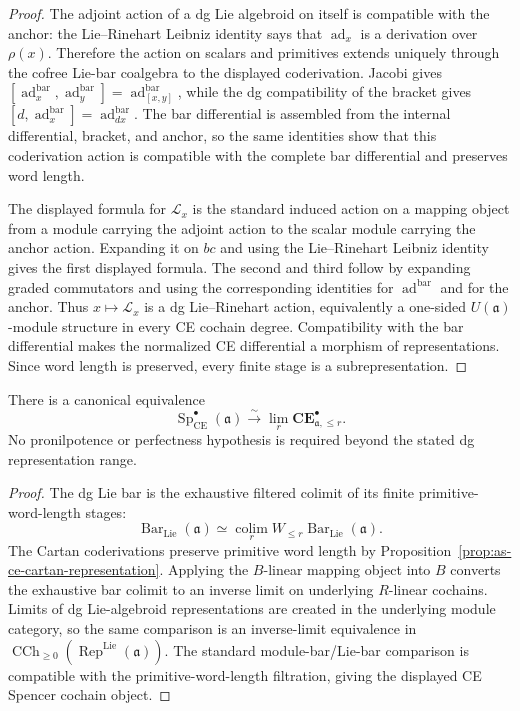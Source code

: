 \begin{proof}
The adjoint action of a dg Lie algebroid on itself is compatible with the
anchor: the Lie--Rinehart Leibniz identity says that $\operatorname{ad}_x$ is
a derivation over $\rho(x)$.  Therefore the action on scalars and primitives
extends uniquely through the cofree Lie-bar coalgebra to the displayed
coderivation.  Jacobi gives
$[\operatorname{ad}^{\mathrm{bar}}_x,
\operatorname{ad}^{\mathrm{bar}}_y]
=\operatorname{ad}^{\mathrm{bar}}_{[x,y]}$, while the dg compatibility of the
bracket gives
$[d,\operatorname{ad}^{\mathrm{bar}}_x]
=\operatorname{ad}^{\mathrm{bar}}_{dx}$.  The bar differential is assembled
from the internal differential, bracket, and anchor, so the same identities
show that this coderivation action is compatible with the complete bar
differential and preserves word length.

The displayed formula for $\mathcal L_x$ is the standard induced action on a
mapping object from a module carrying the adjoint action to the scalar module
carrying the anchor action.  Expanding it on $bc$ and using the
Lie--Rinehart Leibniz identity gives the first displayed formula.  The second
and third follow by expanding graded commutators and using the corresponding
identities for $\operatorname{ad}^{\mathrm{bar}}$ and for the anchor.  Thus
$x\mapsto\mathcal L_x$ is a dg Lie--Rinehart action, equivalently a one-sided
$U(\mathfrak a)$-module structure in every CE cochain degree.  Compatibility
with the bar differential makes the normalized CE differential a morphism of
representations.  Since word length is preserved, every finite stage is a
subrepresentation.
\end{proof}

\begin{proposition}
\label{prop:as-ce-weight-complete}
There is a canonical equivalence
\[
\boxed{
    \operatorname{Sp}_{\mathrm{CE}}^{\bullet}(\mathfrak a)
    \xrightarrow{\sim}
    \lim_r
    \mathbf{CE}^{\bullet}_{\mathfrak a,\le r}.
}
\]
No pronilpotence or perfectness hypothesis is required beyond the stated dg
representation range.
\end{proposition}

\begin{proof}
The dg Lie bar is the exhaustive filtered colimit of its finite
primitive-word-length stages:
\[
    \operatorname{Bar}_{\mathrm{Lie}}(\mathfrak a)
    \simeq
    \operatorname*{colim}_r
    W_{\le r}\operatorname{Bar}_{\mathrm{Lie}}(\mathfrak a).
\]
The Cartan coderivations preserve primitive word length by
Proposition~\ref{prop:as-ce-cartan-representation}.  Applying the $B$-linear
mapping object into $B$ converts the exhaustive bar colimit to an inverse
limit on underlying $R$-linear cochains.  Limits of dg Lie-algebroid
representations are created in the underlying module category, so the same
comparison is an inverse-limit equivalence in
$\operatorname{CCh}_{\geq0}(\operatorname{Rep}^{\mathrm{Lie}}(\mathfrak a))$.
The standard module-bar/Lie-bar comparison is compatible with the
primitive-word-length filtration, giving the displayed CE Spencer cochain
object.
\end{proof}

